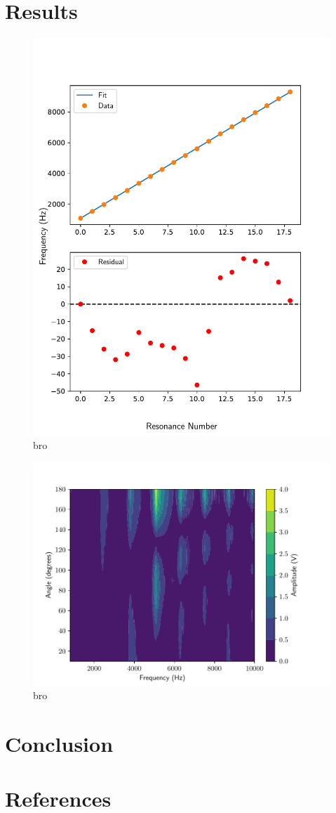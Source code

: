 \documentclass[a4paper, 11pt, twocolumn]{article}
\begin{document}
\section{Results}
\begin{figure}[h]
	\centering
	\includegraphics[scale=1]{../fitting.pdf}
	\caption{bro}
	\label{fig:damped}
\end{figure}
\begin{figure}[h]
	\centering
	\includegraphics[scale=1]{../Rotation.pdf}
	\caption{bro}
	\label{fig:damped}
\end{figure}
\section{Conclusion}
\section*{References}
\end{document}
